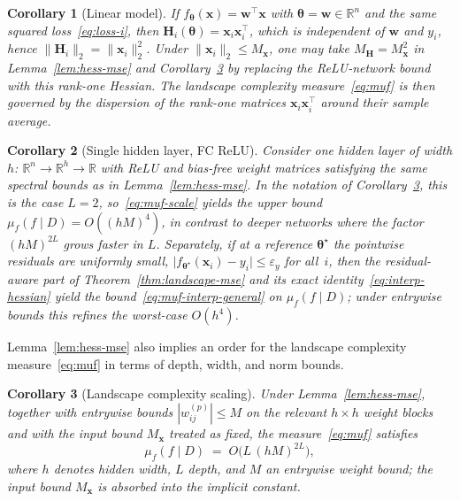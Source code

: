\documentclass[10pt,letterpaper]{article}
\newtheorem{corollary}{Corollary}
\theoremstyle{definition}
\begin{document}
\begin{corollary}[Linear model]\label{cor:linear}\label{sec:particular}
If $f_{\boldsymbol{\theta}}(\mathbf{x})=\mathbf{w}^{\top}\mathbf{x}$ with $\boldsymbol{\theta}=\mathbf{w}\in\mathbb{R}^{n}$ and the same squared loss~\eqref{eq:loss-i}, then
$\mathbf{H}_i(\boldsymbol{\theta})=\mathbf{x}_i\mathbf{x}_i^{\top}$, which is independent of $\mathbf{w}$ and $y_i$, hence
$\|\mathbf{H}_i\|_2=\|\mathbf{x}_i\|_2^2$.
Under $\|\mathbf{x}_i\|_2\le M_{\mathbf{x}}$, one may take $M_{\mathbf{H}}=M_{\mathbf{x}}^2$ in Lemma~\ref{lem:hess-mse} and Corollary~\ref{cor:muf} by replacing the ReLU-network bound with this rank-one Hessian.
The landscape complexity measure~\eqref{eq:muf} is then governed by the dispersion of the rank-one matrices $\mathbf{x}_i\mathbf{x}_i^{\top}$ around their sample average.
\end{corollary}

\begin{corollary}[Single hidden layer, FC ReLU]\label{cor:shallow}
Consider one hidden layer of width $h$: $\mathbb{R}^{n}\to\mathbb{R}^{h}\to\mathbb{R}$ with ReLU and bias-free weight matrices satisfying the same spectral bounds as in Lemma~\ref{lem:hess-mse}.
In the notation of Corollary~\ref{cor:muf}, this is the case $L=2$, so~\eqref{eq:muf-scale} yields the upper bound $\mu_f(f\mid D)=O((hM)^{4})$, in contrast to deeper networks where the factor $(hM)^{2L}$ grows faster in $L$.
Separately, if at a reference $\boldsymbol{\theta}^\star$ the pointwise residuals are uniformly small,
$\bigl|f_{\boldsymbol{\theta}^\star}(\mathbf{x}_i)-y_i\bigr|\le\varepsilon_y$ for all~$i$, then the residual-aware part of Theorem~\ref{thm:landscape-mse} and its exact identity~\eqref{eq:interp-hessian} yield the bound~\eqref{eq:muf-interp-general} on $\mu_f(f\mid D)$; under entrywise bounds this refines the worst-case $O(h^4)$.
\end{corollary}

\noindent
Lemma~\ref{lem:hess-mse} also implies an order for the landscape complexity measure~\eqref{eq:muf} in terms of depth, width, and norm bounds.

\begin{corollary}[Landscape complexity scaling]\label{cor:muf}
Under Lemma~\ref{lem:hess-mse}, together with entrywise bounds $|w_{ij}^{(p)}|\le M$ on the relevant $h\times h$ weight blocks and with the input bound $M_{\mathbf{x}}$ treated as fixed, the measure~\eqref{eq:muf} satisfies
\begin{equation}\label{eq:muf-scale}
  \mu_f(f\mid D) \;=\; O\!\bigl(L\,(hM)^{2L}\bigr),
\end{equation}
where $h$ denotes hidden width, $L$ depth, and $M$ an entrywise weight bound; the input bound $M_{\mathbf{x}}$ is absorbed into the implicit constant.
\end{corollary}
\end{document}
